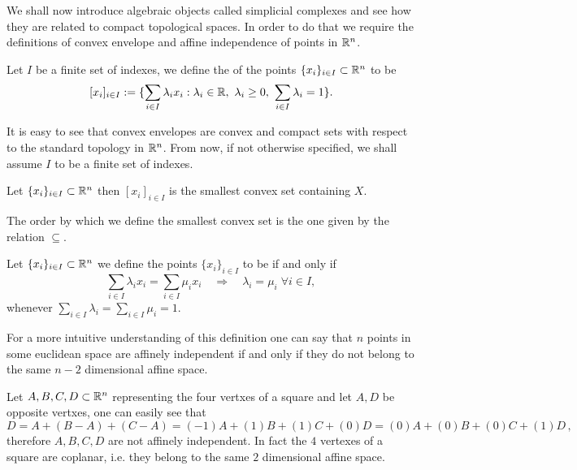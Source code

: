 \documentclass[../1.tex]{subfiles}
\begin{document}
    We shall now introduce algebraic objects called simplicial complexes and see how they are related to compact
    topological spaces. In order to do that we require the definitions of convex envelope and affine independence of points in $\mathbb{R}^n$.

    \begin{defn}
        Let $I$ be a finite set of indexes, we define the  of the points $\{x_i\}_{i \in I} \subset \mathbb{R}^n$ to be 
        \[ [ x_i ]_{i \in I} := \{ \sum_{i \in I} \lambda_i x_i : \lambda_i \in \mathbb{R},\ \lambda_i \geq 0,\  \sum_{i \in I} \lambda_i = 1 \}.\]
    \end{defn}

    It is easy to see that convex envelopes are convex and compact sets with respect to the standard topology in $\mathbb{R}^n$.
    From now, if not otherwise specified, we shall assume $I$ to be a finite set of indexes.

    \begin{prop}
        Let $\{x_i\}_{i \in I} \subset \mathbb{R}^n$ then $[ x_i ]_{i \in I}$ is the smallest convex set containing $X$.
    \end{prop}

    The order by which we define the smallest convex set is the one given by the relation $\subseteq$.


    \begin{defn}
        Let $\{x_i\}_{i \in I} \subset \mathbb{R}^n$ we define the points $\{x_i\}_{i \in I}$ to be  if and only if
        \[ \sum_{i \in I} \lambda_i x_i = \sum_{i \in I} \mu_i x_i \quad \Rightarrow \quad 
        \lambda_i = \mu_i \; \forall i \in I ,\]
        whenever $\sum_{i \in I} \lambda_i = \sum_{i \in I} \mu_i = 1$.
    \end{defn}

    For a more intuitive understanding of this definition one can say that $n$ points in some euclidean space are affinely independent if and only if they do
    not belong to the same $n-2$ dimensional affine space.

    \begin{exa}
        Let ${A,B,C,D} \subset \mathbb{R}^n$ representing the four vertxes of a square and let $A,D$ be opposite vertxes, one can easily see that 
        \[ D = A + (B-A) + (C-A) = (-1)A + (1)B + (1)C + (0)D = (0)A + (0)B + (0)C + (1)D \, ,\]
        therefore $A,B,C,D$ are not affinely independent.
        In fact the $4$ vertexes of a square are coplanar, i.e. they belong to the same $2$ dimensional affine space.
    \end{exa}
\end{document}
